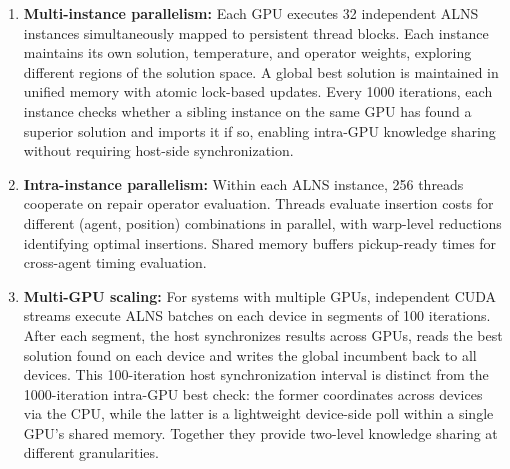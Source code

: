\documentclass{article}
\begin{document}
\begin{enumerate}
\item \textbf{Multi-instance parallelism:} Each GPU executes 32 independent ALNS instances simultaneously mapped to persistent thread blocks. Each instance maintains its own solution, temperature, and operator weights, exploring different regions of the solution space. A global best solution is maintained in unified memory with atomic lock-based updates. Every 1000 iterations, each instance checks whether a sibling instance on the same GPU has found a superior solution and imports it if so, enabling intra-GPU knowledge sharing without requiring host-side synchronization.

\item \textbf{Intra-instance parallelism:} Within each ALNS instance, 256 threads cooperate on repair operator evaluation. Threads evaluate insertion costs for different (agent, position) combinations in parallel, with warp-level reductions identifying optimal insertions. Shared memory buffers pickup-ready times for cross-agent timing evaluation.

\item \textbf{Multi-GPU scaling:} For systems with multiple GPUs, independent CUDA streams execute ALNS batches on each device in segments of 100 iterations. After each segment, the host synchronizes results across GPUs, reads the best solution found on each device and writes the global incumbent back to all devices. This 100-iteration host synchronization interval is distinct from the 1000-iteration intra-GPU best check: the former coordinates across devices via the CPU, while the latter is a lightweight device-side poll within a single GPU's shared memory. Together they provide two-level knowledge sharing at different granularities.
\end{enumerate}
\end{document}
